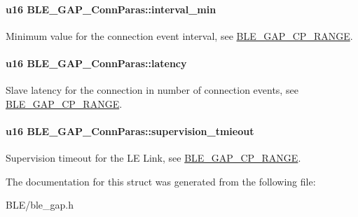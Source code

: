 \paragraph[{\texorpdfstring{interval\+\_\+min}{interval_min}}]{\setlength{\rightskip}{0pt plus 5cm}u16 B\+L\+E\+\_\+\+G\+A\+P\+\_\+\+Conn\+Paras\+::interval\+\_\+min}\hypertarget{struct_b_l_e___g_a_p___conn_paras_a4f3028c0d97368a30baaf8d2362e00ae}{}\label{struct_b_l_e___g_a_p___conn_paras_a4f3028c0d97368a30baaf8d2362e00ae}
Minimum value for the connection event interval, see \hyperlink{group___b_l_e___g_a_p___c_p___r_a_n_g_e}{B\+L\+E\+\_\+\+G\+A\+P\+\_\+\+C\+P\+\_\+\+R\+A\+N\+GE}. 
\paragraph[{\texorpdfstring{latency}{latency}}]{\setlength{\rightskip}{0pt plus 5cm}u16 B\+L\+E\+\_\+\+G\+A\+P\+\_\+\+Conn\+Paras\+::latency}\hypertarget{struct_b_l_e___g_a_p___conn_paras_a3320da60ea7289b4022e1ae51b948803}{}\label{struct_b_l_e___g_a_p___conn_paras_a3320da60ea7289b4022e1ae51b948803}
Slave latency for the connection in number of connection events, see \hyperlink{group___b_l_e___g_a_p___c_p___r_a_n_g_e}{B\+L\+E\+\_\+\+G\+A\+P\+\_\+\+C\+P\+\_\+\+R\+A\+N\+GE}. 
\paragraph[{\texorpdfstring{supervision\+\_\+tmieout}{supervision_tmieout}}]{\setlength{\rightskip}{0pt plus 5cm}u16 B\+L\+E\+\_\+\+G\+A\+P\+\_\+\+Conn\+Paras\+::supervision\+\_\+tmieout}\hypertarget{struct_b_l_e___g_a_p___conn_paras_aba5725cf2f72208547b195d263ea2d4c}{}\label{struct_b_l_e___g_a_p___conn_paras_aba5725cf2f72208547b195d263ea2d4c}
Supervision timeout for the LE Link, see \hyperlink{group___b_l_e___g_a_p___c_p___r_a_n_g_e}{B\+L\+E\+\_\+\+G\+A\+P\+\_\+\+C\+P\+\_\+\+R\+A\+N\+GE}. 

The documentation for this struct was generated from the following file\+:\begin{DoxyCompactItemize}
\item 
B\+L\+E/ble\+\_\+gap.\+h\end{DoxyCompactItemize}
